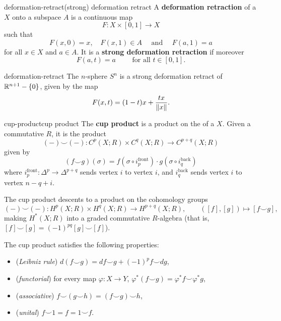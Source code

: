 \begin{topic}{deformation-retract}{(strong) deformation retract}
    A \textbf{deformation retraction} of a  $X$ onto a subspace $A$ is a continuous map
    \[ F : X \times [0, 1] \to X \]
    such that 
    \[ F(x, 0) = x, \quad F(x, 1) \in A \quad \text{ and } \quad F(a, 1) = a \]
    for all $x \in X$ and $a \in A$.
    It is a \textbf{strong deformation retraction} if moreover
    \[ F(a, t) = a \qquad \text{ for all } t \in [0, 1] . \]
\end{topic}

\begin{example}{deformation-retract}
    The $n$-sphere $S^n$ is a strong deformation retract of $\mathbb{R}^{n + 1} - \{ 0 \}$, given by the map
    \[  F(x, t) = (1 - t) x + \frac{t x}{\left\|x\right\|} . \]
\end{example}

\begin{topic}{cup-product}{cup product}
    The \textbf{cup product} is a product on the  of a  $X$. Given a commutative  $R$, it is the product
    \[ (-) \smile (-) : C^p(X; R) \times C^q(X; R) \to C^{p + q}(X; R) \]
    given by
    \[ (f \smile g)(\sigma) = f(\sigma \circ i_p^\text{front}) \cdot g(\sigma \circ i_q^\text{back}) \]
    where $i_p^\text{front} : \Delta^{p} \to \Delta^{p + q}$ sends vertex $i$ to vertex $i$, and $i_q^\text{back}$ sends vertex $i$ to vertex $n - q + i$.
    
    The cup product descents to a product on the cohomology groups
    \[ (-) \smile (-) : H^p(X; R) \times H^q(X; R) \to H^{p + q}(X; R), \qquad ([f], [g]) \mapsto [f \smile g] , \]
    making $H^*(X; R)$ into a graded commutative $R$-algebra (that is, $[f] \smile [g] = (-1)^{pq} [g] \smile [f]$).
    
    The cup product satisfies the following properties:
    \begin{itemize}
        \item (\textit{Leibniz rule}) $d(f \smile g) = df \smile g + (-1)^p f \smile dg$,
        \item (\textit{functorial}) for every map $\varphi : X \to Y$, $\varphi^*(f \smile g) = \varphi^* f \smile \varphi^* g$,
        \item (\textit{associative}) $f \smile (g \smile h) = (f \smile g) \smile h$,
        \item (\textit{unital}) $f \smile 1 = f = 1 \smile f$.
    \end{itemize}
\end{topic}

